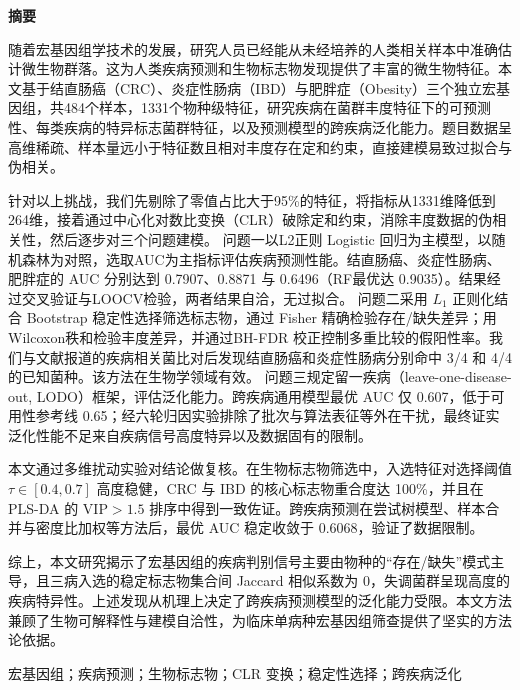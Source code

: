 \begin{center}
{\Large\bfseries 摘要}
\end{center}

随着宏基因组学技术的发展，研究人员已经能从未经培养的人类相关样本中准确估计微生物群落。这为人类疾病预测和生物标志物发现提供了丰富的微生物特征。本文基于结直肠癌（CRC）、炎症性肠病（IBD）与肥胖症（Obesity）三个独立宏基因组，共484个样本，1331个物种级特征，研究疾病在菌群丰度特征下的可预测性、每类疾病的特异标志菌群特征，以及预测模型的跨疾病泛化能力。题目数据呈高维稀疏、样本量远小于特征数且相对丰度存在定和约束，直接建模易致过拟合与伪相关。

针对以上挑战，我们先剔除了零值占比大于95\%的特征，将指标从1331维降低到264维，接着通过中心化对数比变换（CLR）破除定和约束，消除丰度数据的伪相关性，然后逐步对三个问题建模。
问题一以L2正则 Logistic 回归为主模型，以随机森林为对照，选取AUC为主指标评估疾病预测性能。结直肠癌、炎症性肠病、肥胖症的 AUC 分别达到 0.7907、0.8871 与 0.6496（RF最优达 0.9035）。结果经过交叉验证与LOOCV检验，两者结果自洽，无过拟合。
问题二采用 $L_1$ 正则化结合 Bootstrap 稳定性选择筛选标志物，通过 Fisher 精确检验存在/缺失差异；用Wilcoxon秩和检验丰度差异，并通过BH-FDR 校正控制多重比较的假阳性率。我们与文献报道的疾病相关菌比对后发现结直肠癌和炎症性肠病分别命中 3/4 和 4/4 的已知菌种。该方法在生物学领域有效。
问题三规定留一疾病（leave-one-disease-out, LODO）框架，评估泛化能力。跨疾病通用模型最优 AUC 仅 0.607，低于可用性参考线 0.65；经六轮归因实验排除了批次与算法表征等外在干扰，最终证实泛化性能不足来自疾病信号高度特异以及数据固有的限制。

本文通过多维扰动实验对结论做复核。在生物标志物筛选中，入选特征对选择阈值 $\tau\in[0.4,0.7]$ 高度稳健，CRC 与 IBD 的核心标志物重合度达 100\%，并且在 PLS-DA 的 $\mathrm{VIP}>1.5$ 排序中得到一致佐证。跨疾病预测在尝试树模型、样本合并与密度比加权等方法后，最优 AUC 稳定收敛于 0.6068，验证了数据限制。

综上，本文研究揭示了宏基因组的疾病判别信号主要由物种的“存在/缺失”模式主导，且三病入选的稳定标志物集合间 Jaccard 相似系数为 0，失调菌群呈现高度的疾病特异性。上述发现从机理上决定了跨疾病预测模型的泛化能力受限。本文方法兼顾了生物可解释性与建模自洽性，为临床单病种宏基因组筛查提供了坚实的方法论依据。

\vspace{0.6em}
宏基因组；疾病预测；生物标志物；CLR 变换；稳定性选择；跨疾病泛化
